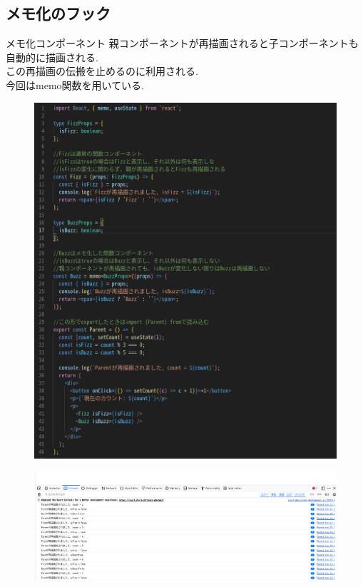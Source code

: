 \documentclass[aspectratio=169]{beamer}
\begin{document}
\subsection{メモ化のフック}
\begin{frame}[allowframebreaks]{メモ化コンポーネント}
    親コンポーネントが再描画されると子コンポーネントも自動的に描画される.\\
    この再描画の伝搬を止めるのに利用される.\\
    今回はmemo関数を用いている.
    \begin{figure}
        \centering
       \includegraphics[scale=0.2]{Parent.png}
    \end{figure}
\end{frame}
\begin{frame}
    \begin{figure}
        \centering
       \includegraphics[scale=0.5]{result_Parent.png}
    \end{figure}
    
\end{frame}
\end{document}
